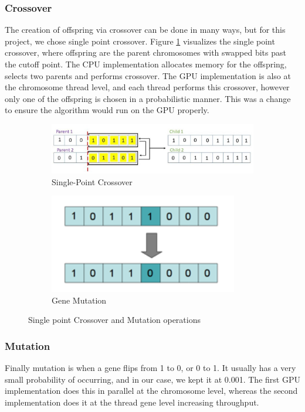 \documentclass[11pt]{article}       %
\begin{document}
\subsubsection{Crossover}
The creation of offspring via crossover can be done in many ways, but for this project, we chose single point crossover. Figure \ref{fig:crossover} visualizes the single point crossover, where offspring are the parent chromosomes with swapped bits past the cutoff point. The CPU implementation allocates memory for the offspring, selects two parents and performs crossover. The GPU implementation is also at the chromosome thread level, and each thread performs this crossover, however only one of the offspring is chosen in a probabilistic manner. This was a change to ensure the algorithm would run on the GPU properly.

\begin{figure}[ht]
\begin{subfigure}{.5\textwidth}
  \centering
  \includegraphics[width=.8\linewidth]{Figures/crossover.png}  
  \caption{Single-Point Crossover}
  \label{fig:crossover}
\end{subfigure}
\begin{subfigure}{.5\textwidth}
  \centering
  \includegraphics[width=.8\linewidth]{Figures/mutation.png}  
  \caption{Gene Mutation}
  \label{fig:mutation}
\end{subfigure}
\caption{Single point Crossover and Mutation operations}
\label{fig:cross-mutate}
\end{figure}

\subsubsection{Mutation}
Finally mutation is when a gene flips from 1 to 0, or 0 to 1. It usually has a very small probability of occurring, and in our case, we kept it at 0.001. The first GPU implementation does this in parallel at the chromosome level, whereas the second implementation does it at the thread gene level increasing throughput.
\end{document}
